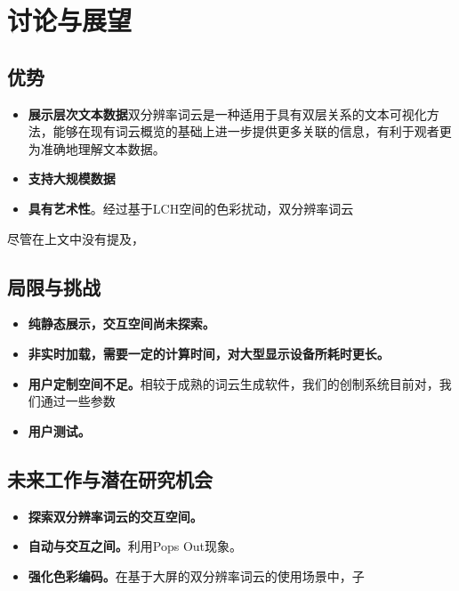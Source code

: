 \chapter{讨论与展望}
\section{优势}
\begin{itemize}
	\item \textbf{展示层次文本数据}双分辨率词云是一种适用于具有双层关系的文本可视化方法，能够在现有词云概览的基础上进一步提供更多关联的信息，有利于观者更为准确地理解文本数据。
	\item \textbf{支持大规模数据}
	\item \textbf{具有艺术性}。经过基于LCH空间的色彩扰动，双分辨率词云
\end{itemize}


尽管在上文中没有提及，
\section{局限与挑战}
\begin{itemize}
	\item \textbf{纯静态展示，交互空间尚未探索。}
	\item \textbf{非实时加载，需要一定的计算时间，对大型显示设备所耗时更长。}
	\item \textbf{用户定制空间不足。}相较于成熟的词云生成软件，我们的创制系统目前对，我们通过一些参数
	\item \textbf{用户测试。}
\end{itemize}

\section{未来工作与潜在研究机会}
\begin{itemize}
	\item \textbf{探索双分辨率词云的交互空间。}
	\item \textbf{自动与交互之间。}利用Pops Out现象。
	\item \textbf{强化色彩编码。}在基于大屏的双分辨率词云的使用场景中，子
\end{itemize}
